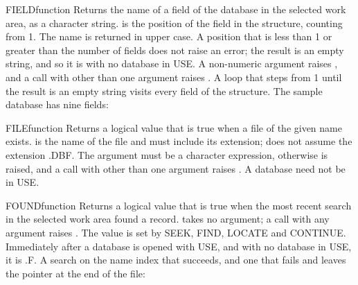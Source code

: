 \begin{XbaseEntry}{FIELD}{function}
Returns the name of a field of the database in the selected work area, as a character string.
\Syntax
{}
\Usage
{} is the position of the field in the structure, counting from 1. The name is returned in upper case. A position that is less than 1 or greater than the number of fields does not raise an error; the result is an empty string, and so it is with no database in USE. A non-numeric argument raises , and a call with other than one argument raises .
\Tips
A loop that steps  from 1 until the result is an empty string visits every field of the structure.
\Examples
The sample database has nine fields:
\end{XbaseEntry}

\begin{XbaseEntry}{FILE}{function}
Returns a logical value that is true when a file of the given name exists.
\Syntax
{}
\Usage
{} is the name of the file and must include its extension;  does not assume the extension .DBF. The argument must be a character expression, otherwise  is raised, and a call with other than one argument raises . A database need not be in USE.
\Examples
{}
\end{XbaseEntry}

\begin{XbaseEntry}{FOUND}{function}
Returns a logical value that is true when the most recent search in the selected work area found a record.
\Syntax
{}
\Usage
{} takes no argument; a call with any argument raises . The value is set by SEEK, FIND, LOCATE and CONTINUE. Immediately after a database is opened with USE, and with no database in USE, it is .F.
\Examples
A search on the name index that succeeds, and one that fails and leaves the pointer at the end of the file:
\end{XbaseEntry}

